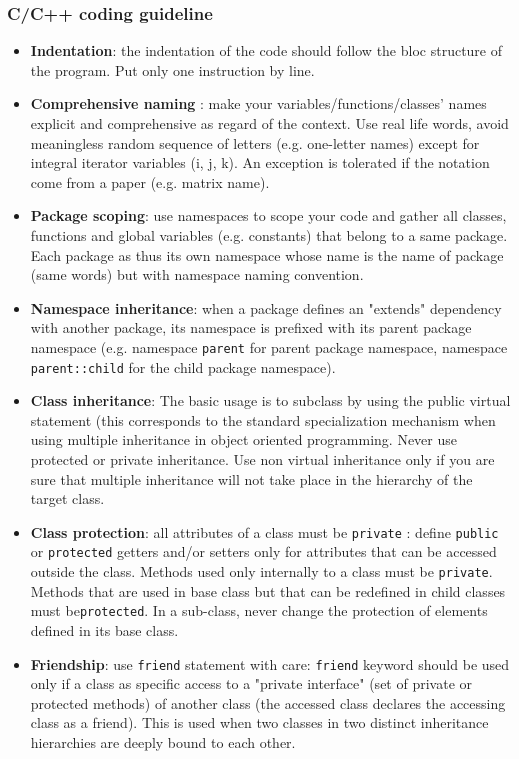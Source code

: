 \documentclass[12pt,a4paper]{article}
\begin{document}
\subsubsection{C/C++ coding guideline}
\begin{itemize}
\item \textbf{Indentation}: the indentation of the code should follow the bloc structure of the program. Put only one instruction by line.
\item \textbf{Comprehensive naming} : make your variables/functions/classes' names explicit and comprehensive as regard of the context. Use real life words, avoid meaningless random sequence of letters (e.g. one-letter names) except for integral iterator variables (i, j, k). An exception is tolerated if the notation come from a paper (e.g. matrix name).
\item \textbf{Package scoping}: use namespaces to scope your code and gather all classes, functions and global variables (e.g. constants) that belong to a same package. Each package as thus its own namespace whose name is the name of package (same words) but with namespace naming convention.
\item \textbf{Namespace inheritance}: when a package defines an "extends" dependency with another package, its namespace is prefixed with its parent package namespace (e.g. namespace \texttt{parent} for parent package namespace, namespace \texttt{parent::child} for the child package namespace).
\item \textbf{Class inheritance}: The basic usage is to subclass by using the public virtual statement (this  corresponds to the standard specialization mechanism when using multiple inheritance in object oriented programming. Never use protected or private inheritance. Use non virtual inheritance only if you are sure that  multiple inheritance will not take place in the hierarchy of the target class.
\item \textbf{Class protection}:  all attributes of a class must be \texttt{private} : define \texttt{public} or \texttt{protected} getters and/or setters only for attributes that can be accessed outside the class. Methods used only internally to a class must be \texttt{private}. Methods that are used in base class but that can be redefined in child classes must be\texttt{protected}. In a sub-class, never change the protection of elements defined in its base class.
\item \textbf{Friendship}: use \texttt{friend} statement with care: \texttt{friend} keyword should be used only if a class as specific access to a "private interface" (set of private or protected methods) of another class (the accessed class declares the accessing class as a friend). This is used when two classes in two distinct inheritance hierarchies are deeply bound to each other. 

\end{itemize}
\end{document}
